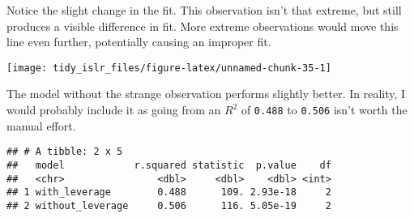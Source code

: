 \documentclass[]{book}
\newenvironment{Shaded}{\begin{snugshade}}{\end{snugshade}}
\newcommand{\DataTypeTok}[1]{\textcolor[rgb]{0.13,0.29,0.53}{#1}}
\newcommand{\DecValTok}[1]{\textcolor[rgb]{0.00,0.00,0.81}{#1}}
\newcommand{\KeywordTok}[1]{\textcolor[rgb]{0.13,0.29,0.53}{\textbf{#1}}}
\newcommand{\NormalTok}[1]{#1}
\newcommand{\OperatorTok}[1]{\textcolor[rgb]{0.81,0.36,0.00}{\textbf{#1}}}
\newcommand{\StringTok}[1]{\textcolor[rgb]{0.31,0.60,0.02}{#1}}
\begin{document}
Notice the slight change in the fit. This observation isn't that extreme, but still produces a visible difference in fit. More extreme observations would move this line even further, potentially causing an improper fit.

\begin{Shaded}
\end{Shaded}

\begin{center}\texttt{[image: tidy\_islr\_files/figure-latex/unnamed-chunk-35-1]} \end{center}

The model without the strange observation performs slightly better. In reality, I would probably include it as going from an \(R^2\) of \texttt{0.488} to \texttt{0.506} isn't worth the manual effort.

\begin{Shaded}
\end{Shaded}

\begin{verbatim}
## # A tibble: 2 x 5
##   model            r.squared statistic  p.value    df
##   <chr>                <dbl>     <dbl>    <dbl> <int>
## 1 with_leverage        0.488      109. 2.93e-18     2
## 2 without_leverage     0.506      116. 5.05e-19     2
\end{verbatim}
\end{document}
